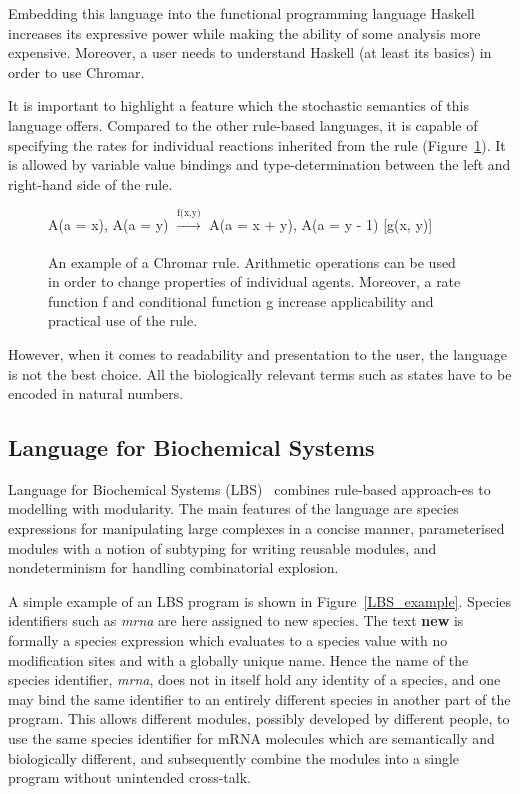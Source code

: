 \documentclass[11pt,a4paper]{report}
\begin{document}
Embedding this language into the functional programming language Haskell increases its expressive power while making the ability of some analysis more expensive. Moreover, a user needs to understand Haskell (at least its basics) in order to use Chromar.

It is important to highlight a feature which the stochastic semantics of this language offers. Compared to the other rule-based languages, it is capable of specifying the rates for individual reactions inherited from the rule (Figure~\ref{chromar_rule}). It is allowed by variable value bindings and type-determination between the left and right-hand side of the rule.

\begin{figure}[!h]
\begin{center}
A(a = x), A(a = y) $\xrightarrow[]{\text{f(x,y)}}$ A(a = x + y), A(a = y - 1) [g(x, y)]
\end{center}
\caption{An example of a Chromar rule. Arithmetic operations can be used in order to change properties of individual agents. Moreover, a rate function f and conditional function g increase applicability and practical use of the rule.}\label{chromar-rule}\label{chromar_rule}
\end{figure}

However, when it comes to readability and presentation to the user, the language is not the best choice. All the biologically relevant terms such as states have to be encoded in natural numbers.

\subsection{Language for Biochemical Systems}

Language for Biochemical Systems (LBS)~\cite{Pedersen} combines rule-based approach-es to modelling with modularity. The main features of the language are species expressions for manipulating large complexes in a concise manner, parameterised modules with a notion of subtyping for writing reusable modules, and nondeterminism for handling combinatorial explosion.

A simple example of an LBS program is shown in Figure~\ref{LBS_example}. Species identifiers such as \emph{mrna} are here assigned to new species. The text \textbf{new{}} is formally a species expression which evaluates to a species value with no modification sites and with a globally unique name. Hence the name of the species identifier, \emph{mrna}, does not in itself hold any identity of a species, and one may bind the same identifier to an entirely different species in another part of the program. This allows different modules, possibly developed by different people, to use the same species identifier for mRNA molecules which are semantically and biologically different, and subsequently combine the modules into a single program without unintended cross-talk.
\end{document}
